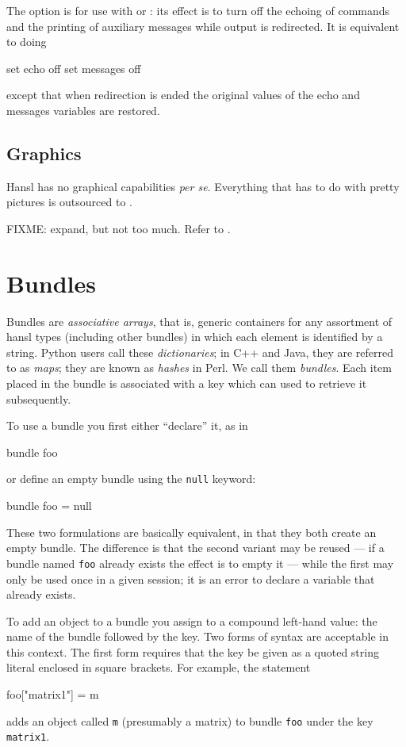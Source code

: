 The  option is for use with  or
: its effect is to turn off the echoing of commands and
the printing of auxiliary messages while output is redirected. It is
equivalent to doing
\begin{code}
  set echo off 
  set messages off
\end{code}
except that when redirection is ended the original values of the echo
and messages variables are restored.

\section{Graphics}

Hansl has no graphical capabilities \emph{per se}. Everything that has
to do with pretty pictures is outsourced to . 

FIXME: expand, but not too much. Refer to \GUG.

\chapter{Bundles}
\label{chap:bundles}

Bundles are \emph{associative arrays}, that is, generic containers for
any assortment of hansl types (including other bundles) in which each
element is identified by a string. Python users call these
\emph{dictionaries}; in C++ and Java, they are referred to as
\emph{maps}; they are known as \emph{hashes} in Perl. We call them
\emph{bundles}. Each item placed in the bundle is associated with a
key which can used to retrieve it subsequently.

To use a bundle you first either ``declare'' it, as in
%
\begin{code}
bundle foo
\end{code}
%
or define an empty bundle using the \texttt{null} keyword:
%
\begin{code}
bundle foo = null
\end{code}
%
These two formulations are basically equivalent, in that they both
create an empty bundle. The difference is that the second variant
may be reused --- if a bundle named \texttt{foo} already exists the
effect is to empty it --- while the first may only be used once in
a given  session; it is an error to declare a variable that
already exists. 

To add an object to a bundle you assign to a compound left-hand value:
the name of the bundle followed by the key. Two forms of syntax are
acceptable in this context. The first form requires that the key be
given as a quoted string literal enclosed in square brackets.  For
example, the statement
\begin{code}
foo["matrix1"] = m
\end{code}
adds an object called \texttt{m} (presumably a matrix) to bundle
\texttt{foo} under the key \texttt{matrix1}. 

